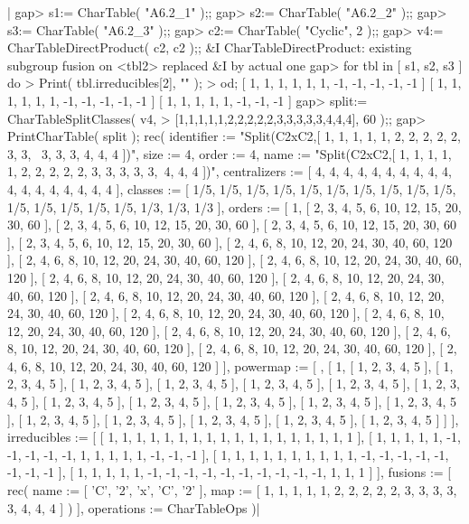 |    gap> s1:= CharTable( "A6.2_1" );;
    gap> s2:= CharTable( "A6.2_2" );;
    gap> s3:= CharTable( "A6.2_3" );;
    gap> c2:= CharTable( "Cyclic", 2 );;
    gap> v4:= CharTableDirectProduct( c2, c2 );;
    &I CharTableDirectProduct: existing subgroup fusion on <tbl2> replaced
    &I    by actual one
    gap> for tbl in [ s1, s2, s3 ] do
    >      Print( tbl.irreducibles[2], "\n" );
    >    od;
    [ 1, 1, 1, 1, 1, 1, -1, -1, -1, -1, -1 ]
    [ 1, 1, 1, 1, 1, 1, -1, -1, -1, -1, -1 ]
    [ 1, 1, 1, 1, 1, -1, -1, -1 ]
    gap> split:= CharTableSplitClasses( v4,
    >              [1,1,1,1,1,2,2,2,2,2,3,3,3,3,3,4,4,4], 60 );;
    gap> PrintCharTable( split );
    rec( identifier := "Split(C2xC2,[ 1, 1, 1, 1, 1, 2, 2, 2, 2, 2, 3, 3, \
    3, 3, 3, 4, 4, 4 ])", size := 4, order :=
    4, name := "Split(C2xC2,[ 1, 1, 1, 1, 1, 2, 2, 2, 2, 2, 3, 3, 3, 3, 3,\
     4, 4, 4 ])", centralizers := [ 4, 4, 4, 4, 4, 4, 4, 4, 4, 4, 4, 4,
      4, 4, 4, 4, 4, 4 ], classes := [ 1/5, 1/5, 1/5, 1/5, 1/5, 1/5, 1/5,
      1/5, 1/5, 1/5, 1/5, 1/5, 1/5, 1/5, 1/5, 1/3, 1/3, 1/3 ], orders :=
    [ 1, [ 2, 3, 4, 5, 6, 10, 12, 15, 20, 30, 60 ],
      [ 2, 3, 4, 5, 6, 10, 12, 15, 20, 30, 60 ],
      [ 2, 3, 4, 5, 6, 10, 12, 15, 20, 30, 60 ],
      [ 2, 3, 4, 5, 6, 10, 12, 15, 20, 30, 60 ],
      [ 2, 4, 6, 8, 10, 12, 20, 24, 30, 40, 60, 120 ],
      [ 2, 4, 6, 8, 10, 12, 20, 24, 30, 40, 60, 120 ],
      [ 2, 4, 6, 8, 10, 12, 20, 24, 30, 40, 60, 120 ],
      [ 2, 4, 6, 8, 10, 12, 20, 24, 30, 40, 60, 120 ],
      [ 2, 4, 6, 8, 10, 12, 20, 24, 30, 40, 60, 120 ],
      [ 2, 4, 6, 8, 10, 12, 20, 24, 30, 40, 60, 120 ],
      [ 2, 4, 6, 8, 10, 12, 20, 24, 30, 40, 60, 120 ],
      [ 2, 4, 6, 8, 10, 12, 20, 24, 30, 40, 60, 120 ],
      [ 2, 4, 6, 8, 10, 12, 20, 24, 30, 40, 60, 120 ],
      [ 2, 4, 6, 8, 10, 12, 20, 24, 30, 40, 60, 120 ],
      [ 2, 4, 6, 8, 10, 12, 20, 24, 30, 40, 60, 120 ],
      [ 2, 4, 6, 8, 10, 12, 20, 24, 30, 40, 60, 120 ],
      [ 2, 4, 6, 8, 10, 12, 20, 24, 30, 40, 60, 120 ] ], powermap :=
    [ , [ 1, [ 1, 2, 3, 4, 5 ], [ 1, 2, 3, 4, 5 ], [ 1, 2, 3, 4, 5 ],
          [ 1, 2, 3, 4, 5 ], [ 1, 2, 3, 4, 5 ], [ 1, 2, 3, 4, 5 ],
          [ 1, 2, 3, 4, 5 ], [ 1, 2, 3, 4, 5 ], [ 1, 2, 3, 4, 5 ],
          [ 1, 2, 3, 4, 5 ], [ 1, 2, 3, 4, 5 ], [ 1, 2, 3, 4, 5 ],
          [ 1, 2, 3, 4, 5 ], [ 1, 2, 3, 4, 5 ], [ 1, 2, 3, 4, 5 ],
          [ 1, 2, 3, 4, 5 ], [ 1, 2, 3, 4, 5 ] ] ], irreducibles :=
    [ [ 1, 1, 1, 1, 1, 1, 1, 1, 1, 1, 1, 1, 1, 1, 1, 1, 1, 1 ],
      [ 1, 1, 1, 1, 1, -1, -1, -1, -1, -1, 1, 1, 1, 1, 1, -1, -1, -1 ],
      [ 1, 1, 1, 1, 1, 1, 1, 1, 1, 1, -1, -1, -1, -1, -1, -1, -1, -1 ],
      [ 1, 1, 1, 1, 1, -1, -1, -1, -1, -1, -1, -1, -1, -1, -1, 1, 1, 1 ]
     ], fusions := [ rec(
          name := [ 'C', '2', 'x', 'C', '2' ],
          map := [ 1, 1, 1, 1, 1, 2, 2, 2, 2, 2, 3, 3, 3, 3, 3, 4, 4, 4 ]
         ) ], operations := CharTableOps )|

